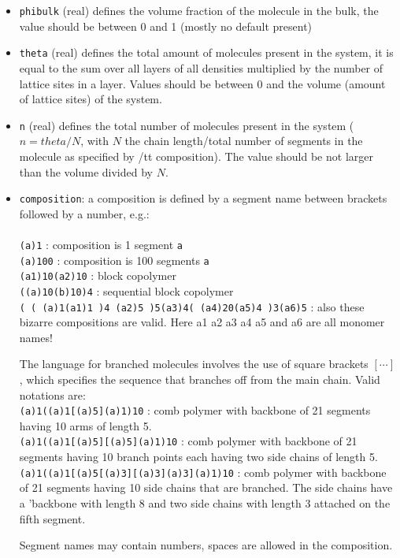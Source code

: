 \documentclass{article}
\begin{document}
\begin{itemize}
\item {\tt phibulk} (real) defines the volume fraction of the molecule in the bulk, the value should be between 0 and 1 (mostly no default present)

\item {\tt theta} (real) defines the total amount of molecules present in the system, it is equal to the sum over all layers of all densities multiplied by the number of lattice sites in a layer.  Values should be between 0 and the volume (amount of lattice sites) of the system.  

\item {\tt n} (real) defines the total number of molecules present in the system ($n=theta/N$, with $N$ the chain length/total number of segments in the molecule as specified by {/tt composition}). The value should be not larger than the volume divided by $N$.

\item {\tt composition}:  a composition is defined by a segment name between brackets followed by a number, e.g.:\\
\\
{\tt (a)1} : composition is 1 segment {\tt a}\\
{\tt (a)100} : composition is 100 segments {\tt a}\\
{\tt (a1)10(a2)10} : block copolymer\\
{\tt ((a)10(b)10)4} : sequential block copolymer\\
{\tt ( ( (a)1(a1)1 )4 (a2)5 )5(a3)4( (a4)20(a5)4 )3(a6)5} : also these bizarre compositions are valid. Here a1 a2 a3 a4 a5 and a6 are all monomer names!

The language for branched molecules involves the use of square brackets $[ \cdots ]$, which specifies the sequence that branches off from the main chain.  Valid notations are: \\
{\tt (a)1((a)1[(a)5](a)1)10} : comb polymer with backbone of 21 segments having 10 arms of length 5. \\
{\tt (a)1((a)1[(a)5][(a)5](a)1)10} : comb polymer with backbone of 21 segments having 10 branch points each having two side chains of length 5.\\
{\tt (a)1((a)1[(a)5[(a)3][(a)3](a)3](a)1)10} : comb polymer with backbone of 21 segments having 10 side chains that are branched. The side chains have a 'backbone with length 8 and two side chains with length 3 attached on the fifth segment.  

Segment names may contain numbers, spaces are allowed in the composition.


\end{itemize}
\end{document}
